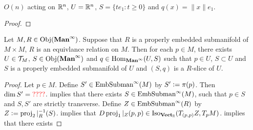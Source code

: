 \documentclass{book}
\begin{document}
\begin{ex} 
	$O(n)$ acting on $\mathbb{R}^n$, $U = \mathbb{R}^n$, $S = \{te_1:t \geq 0\}$ and $q(x) = \|x\|e_1$.
\end{ex}

\begin{proof}
	
\end{proof}



\begin{ex}  
	Let $M, R \in \operatorname{Obj}(\operatorname*{\text{\textbf{Man}}^{\infty}})$. Suppose that $R$ is a properly embedded submanifold of $M \times M$, $R$ is an equivlance relation on $M$. Then for each $p \in M$, there exists $U \in \mathcal{T}_M$, $S \in \operatorname{Obj}(\operatorname*{\text{\textbf{Man}}^{\infty}})$ and $q \in \operatorname{Hom}_{\operatorname*{\text{\textbf{Man}}^{\infty}}}(U, S)$ such that $p \in U$, $S \subset U$ and $S$ is a properly embedded submanifold of $U$ and $(S,q)$ is a $R$-slice of $U$. 
\end{ex}

\begin{proof}
	Let $p \in M$. Define $S' \in \operatorname{\text{EmbSubman}^{\infty}}(M)$ by $S' \vcentcolon= \pi(p)$. Then $\dim S' = \textcolor{red}{????}$.  implies that there exists  $S \in \operatorname{\text{EmbSubman}^{\infty}}(M)$, such that $p \in S$ and $S, S'$ are strictly transverse. Define $Z \in \operatorname{\text{EmbSubman}^{\infty}}(R)$ by $Z \vcentcolon= \operatorname{\text{proj}}_2|_R^{-1}(S)$.  implies that  $D\operatorname{\text{proj}}_1|_Z(p,p) \in \operatorname{Iso}_{\operatorname*{\text{\textbf{Vect}}_{\mathbb{R}}}}(T_{(p,p)}Z, T_pM)$.  implies that there exists 
\end{proof}
\end{document}
